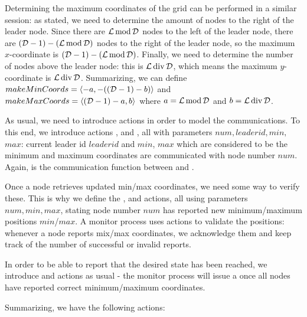 Determining the maximum coordinates of the grid can be performed in a similar session: as stated, we need to determine the amount of nodes to the right of the leader node. Since there are $\mathcal{L} \operatorname{mod} \mathcal{D}$ nodes to the left of the leader node, there are $(\mathcal{D} - 1) - (\mathcal{L} \operatorname{mod} \mathcal{D})$ nodes to the right of the leader node, so the maximum $x$-coordinate is $(\mathcal{D} - 1) - (\mathcal{L} \operatorname{mod} \mathcal{D})$. Finally, we need to determine the number of nodes above the leader node: this is $\mathcal{L} \operatorname{div} \mathcal{D}$, which means the maximum $y$-coordinate is $\mathcal{L} \operatorname{div} \mathcal{D}$. Summarizing, we can define $makeMinCoords = \langle -a, -((\mathcal{D} - 1) - b) \rangle$ and $makeMaxCoords = \langle (\mathcal{D} - 1) - a, b \rangle$ where $a = \mathcal{L} \operatorname{mod} \mathcal{D}$ and $b = \mathcal{L} \operatorname{div} \mathcal{D}$.

As usual, we need to introduce actions in order to model the communications. To this end, we introduce actions ,  and , all with parameters $num,leaderid,min,$ $max$: current leader id $leaderid$ and $min$, $max$ which are considered to be the minimum and maximum coordinates are communicated with node number $num$. Again,  is the communication function between  and .

Once a node retrieves updated min/max coordinates, we need some way to verify these. This is why we define the ,  and  actions, all using parameters $num,min,max$, stating node number $num$ has reported new minimum/maximum positions $min$/$max$. A monitor process uses  actions to validate the positions: whenever a node reports mix/max coordinates, we acknowledge them and keep track of the number of successful or invalid reports.

In order to be able to report that the desired state has been reached, we introduce  and  actions as usual - the monitor process will issue a  once all nodes have reported correct minimum/maximum coordinates.

Summarizing, we have the following actions:

